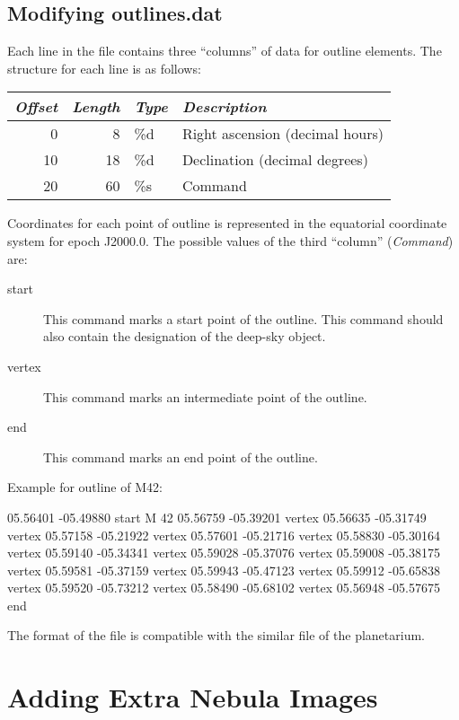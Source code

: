 \subsection{Modifying outlines.dat}
\label{sec:dso:modifyingOutlines}

\noindent{}Each line in the file  contains three ``columns'' of data for outline elements. The structure for each line is as follows:

\noindent%
\begin{tabularx}{\textwidth}{r|r|l|X}
\toprule
\emph{Offset} & \emph{Length} & \emph{Type} & \emph{Description}\\
\midrule
0  &  8 & \%d  & Right ascension (decimal hours)\\
10 & 18 & \%d  & Declination (decimal degrees)\\
20 & 60 & \%s  & Command\\
\bottomrule
\end{tabularx}

\noindent Coordinates for each point of outline is represented in the equatorial coordinate system for epoch J2000.0. 
The possible values of the third ``column'' (\emph{Command}) are:
\begin{description}
\item[start] This command marks a start point of the outline. This command should also contain the designation of the deep-sky object.
\item[vertex] This command marks an intermediate point of the outline.
\item[end] This command marks an end point of the outline.
\end{description}


Example for outline of M42:
\begin{configfile}
05.56401 -05.49880 start  M 42 
05.56759 -05.39201 vertex 
05.56635 -05.31749 vertex 
05.57158 -05.21922 vertex 
05.57601 -05.21716 vertex 
05.58830 -05.30164 vertex 
05.59140 -05.34341 vertex 
05.59028 -05.37076 vertex 
05.59008 -05.38175 vertex 
05.59581 -05.37159 vertex 
05.59943 -05.47123 vertex 
05.59912 -05.65838 vertex 
05.59520 -05.73212 vertex 
05.58490 -05.68102 vertex 
05.56948 -05.57675 end
\end{configfile}

The format of the file  is compatible with the similar file of the  planetarium.

\section{Adding Extra Nebula Images}%
\label{sec:dso:adding_images}


